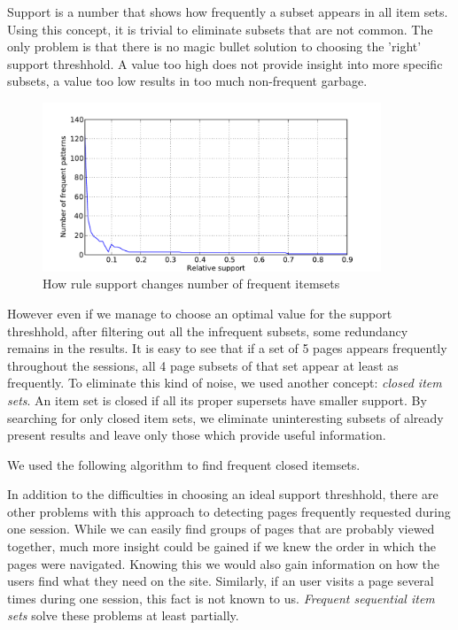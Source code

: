 \documentclass[english,a4paper]{article}
\begin{document}
Support is a number that shows how frequently a subset appears in all item sets. Using this concept, it is trivial to eliminate subsets that are not common. The only problem is that there is no magic bullet solution to choosing the 'right' support threshhold. A value too high does not provide insight into more specific subsets, a value too low results in too much non-frequent garbage.

\begin{figure}[H]
  \centering
      \includegraphics[width=0.9\textwidth]{apriori_closed_itemset_count}
  \caption{How rule support changes number of frequent itemsets}
\end{figure}


However even if we manage to choose an optimal value for the support threshhold, after filtering out all the infrequent subsets, some redundancy remains in the results. It is easy to see that if a set of 5 pages appears frequently throughout the sessions, all 4 page subsets of that set appear at least as frequently. To eliminate this kind of noise, we used another concept: \emph{closed item sets}. An item set is closed if all its proper supersets have smaller support. By searching for only closed item sets, we eliminate uninteresting subsets of already present results and leave only those which provide useful information.

We used the following algorithm to find frequent closed itemsets.

In addition to the difficulties in choosing an ideal support threshhold, there are other problems with this approach to detecting pages frequently requested during one session. While we can easily find groups of pages that are probably viewed together, much more insight could be gained if we knew the order in which the pages were navigated. Knowing this we would also gain information on how the users find what they need on the site. Similarly, if an user visits a page several times during one session, this fact is not known to us. \emph{Frequent sequential item sets} solve these problems at least partially.
\end{document}
